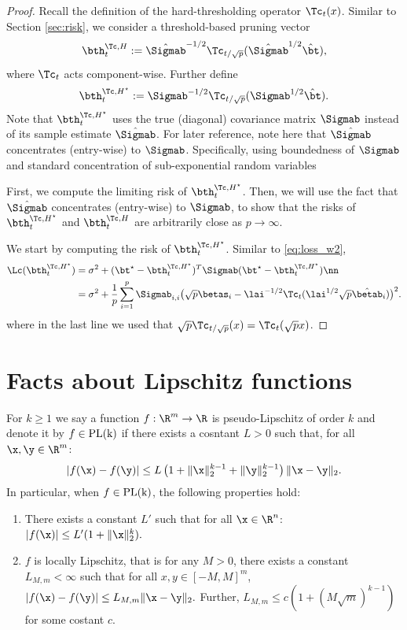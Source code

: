 \begin{proof}
Recall the definition of the hard-thresholding operator $\Tc_t(x)$. Similar to Section \ref{sec:risk}, we consider a threshold-based pruning vector $$\bth^{\Tc,H}_{t} := \hat\Sigmab^{-1/2}\Tc_{t/\sqrt{p}}(\hat\Sigmab^{1/2}\hat\bt),$$ where $\Tc_t$ acts component-wise. Further define 
$$\bth^{\Tc,H^\star}_{t} := \Sigmab^{-1/2}\Tc_{t/\sqrt{p}}(\Sigmab^{1/2}\hat\bt).$$
Note that $\bth^{\Tc,H^\star}_{t}$ uses the true (diagonal) covariance matrix $\Sigmab$ instead of its sample estimate $\hat\Sigmab$. For later reference, note here that $\hat\Sigmab$ concentrates (entry-wise) to $\Sigmab$. Specifically, using boundedness of $\Sigmab$ and standard concentration of sub-exponential random variables


First, we compute the limiting risk of $\bth^{\Tc,H^\star}_{t}$. Then, we will use the fact that $\hat\Sigmab$ concentrates (entry-wise) to $\Sigmab$, to show that the risks of $\bth^{\Tc,H^\star}_{t}$ and $\bth^{\Tc,H}_{t}$ are arbitrarily close as $p\rightarrow\infty$.

We start by computing the risk of $\bth^{\Tc,H^\star}_{t}$. Similar to \eqref{eq:loss_w2}, 
\begin{align}
\Lc(\bth^{\Tc,H^\star}_t) &= \sigma^2 + (\bt^\star-\bth^{\Tc,H^\star}_t)^T\Sigmab(\bt^\star-\bth^{\Tc,H^\star}_t) \nn \\
  &= \sigma^2 + \frac{1}{p}\sum_{i=1}^p\Sigmab_{i,i}\big(\sqrt{p}\betas_i-\lai^{-1/2}\Tc_{t}(\lai^{1/2}\sqrt{p}\hat\betab_i)\big)^2.
\end{align}
where in the last line we used that $\sqrt{p}\Tc_{t/\sqrt{p}}(x)=\Tc_{t}(\sqrt{p}x)$.
\end{proof}


\section{Facts about Lipschitz functions}\label{SM useful fact}
For $k\geq 1$ we say a function $f:\R^m\rightarrow\R$ is pseudo-Lipschitz of order $k$ and denote it by $f\in \rm{PL}(k)$ if there exists a cosntant $L>0$ such that, for all $\x,\y\in\R^m$:
\begin{align}
|f(\x)-f(\y)|\leq L\left(1+\|\x\|_2^{k-1}+\|\y\|_2^{k-1}\right)\|\x-\y\|_2.\label{PL func}
\end{align}
In particular, when $f\in\rm{PL}(k)$, the following properties hold:
\begin{enumerate}
\item There exists a constant $L'$ such that for all $\x\in\R^n$: $|f(\x)|\leq L'(1+\|\x\|_2^k).$

\item $f$ is locally Lipschitz, that is for any $M>0$, there exists a constant $L_{M,m}<\infty$ such that for all $x,y\in[-M,M]^m$,
$
|f(\x)-f(\y)| \leq L_{M,m}\|\x-\y\|_2.
$
Further, $L_{M,m}\leq c(1+(M\sqrt{m})^{k-1})$ for some costant $c$.
\end{enumerate}


